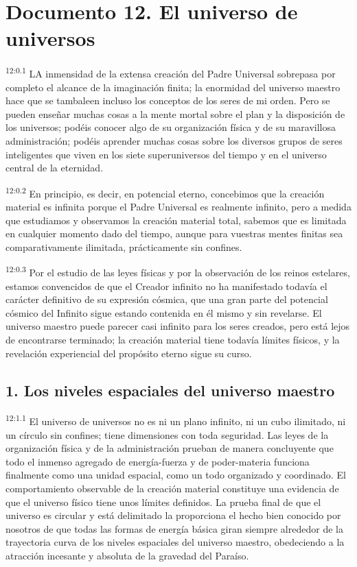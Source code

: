 \chapter{Documento 12. El universo de universos}
\par
\textsuperscript{12:0.1} LA inmensidad de la extensa creación del Padre Universal sobrepasa por completo el alcance de la imaginación finita; la enormidad del universo maestro hace que se tambaleen incluso los conceptos de los seres de mi orden. Pero se pueden enseñar muchas cosas a la mente mortal sobre el plan y la disposición de los universos; podéis conocer algo de su organización física y de su maravillosa administración; podéis aprender muchas cosas sobre los diversos grupos de seres inteligentes que viven en los siete superuniversos del tiempo y en el universo central de la eternidad.

\par
\textsuperscript{12:0.2} En principio, es decir, en potencial eterno, concebimos que la creación material es infinita porque el Padre Universal es realmente infinito, pero a medida que estudiamos y observamos la creación material total, sabemos que es limitada en cualquier momento dado del tiempo, aunque para vuestras mentes finitas sea comparativamente ilimitada, prácticamente sin confines.

\par
\textsuperscript{12:0.3} Por el estudio de las leyes físicas y por la observación de los reinos estelares, estamos convencidos de que el Creador infinito no ha manifestado todavía el carácter definitivo de su expresión cósmica, que una gran parte del potencial cósmico del Infinito sigue estando contenida en él mismo y sin revelarse. El universo maestro puede parecer casi infinito para los seres creados, pero está lejos de encontrarse terminado; la creación material tiene todavía límites físicos, y la revelación experiencial del propósito eterno sigue su curso.

\section*{1. Los niveles espaciales del universo maestro}
\par
\textsuperscript{12:1.1} El universo de universos no es ni un plano infinito, ni un cubo ilimitado, ni un círculo sin confines; tiene dimensiones con toda seguridad. Las leyes de la organización física y de la administración prueban de manera concluyente que todo el inmenso agregado de energía-fuerza y de poder-materia funciona finalmente como una unidad espacial, como un todo organizado y coordinado. El comportamiento observable de la creación material constituye una evidencia de que el universo físico tiene unos límites definidos. La prueba final de que el universo es circular y está delimitado la proporciona el hecho bien conocido por nosotros de que todas las formas de energía básica giran siempre alrededor de la trayectoria curva de los niveles espaciales del universo maestro, obedeciendo a la atracción incesante y absoluta de la gravedad del Paraíso.

